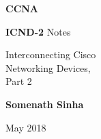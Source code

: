 \begin{titlepage}
	\begin{center}
		\vspace*{1cm}
		
		\Huge
		\textbf{CCNA}
		\vspace*{50pt}
		
		\LARGE
		\textbf{ICND-2} Notes
		
		\large
		Interconnecting Cisco \\
		Networking Devices, \\
		Part 2
		
		\vspace{100pt}
		
		\large
		\textbf{Somenath Sinha}
		
		\normalsize
		May 2018
		
	\end{center}
\end{titlepage}